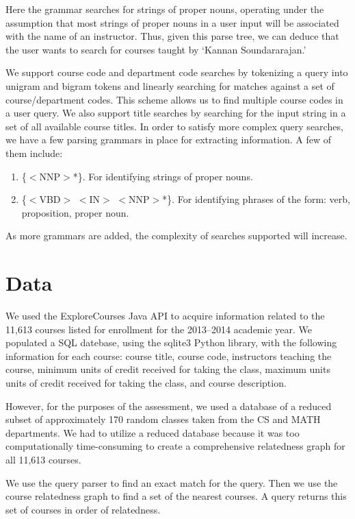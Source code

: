 \documentclass[12pt]{article}
\begin{document}
\noindent Here the grammar searches for strings of proper nouns, operating under the assumption that most strings of proper nouns in a user input will be associated with the name of an instructor. Thus, given this parse tree, we can deduce that the user wants to search for courses taught by `Kannan Soundararajan.'


We support course code and department code searches by tokenizing a
query into unigram and bigram tokens and linearly searching for
matches against a set of course/department codes. This scheme allows
us to find multiple course codes in a user query. We also support
title searches by searching for the input string in a set of all
available course titles. In order to satisfy more complex query
searches, we have a few parsing grammars in place for extracting
information. A few of them include:
\begin{enumerate}
	\item \{$<$NNP$>$*\}. For identifying strings of proper nouns.

	\item \{$<$VBD$>$ $<$IN$>$ $<$NNP$>$*\}. For identifying phrases of the form: verb, proposition, proper noun.
\end{enumerate}

As more grammars are added, the complexity of searches supported will increase.


\section*{Data}
We used the ExploreCourses Java API to acquire information related to
the 11,613 courses listed for enrollment for the 2013–2014 academic
year. We populated a SQL datebase, using the sqlite3 Python library,
with the following information for each course: course title, course
code, instructors teaching the course, minimum units of credit
received for taking the class, maximum units units of credit received
for taking the class, and course description.

However, for the purposes of the assessment, we used a database of a
reduced subset of approximately 170 random classes taken from the CS
and MATH departments. We had to utilize a reduced database because it
was too computationally time-consuming to create a comprehensive relatedness graph for
all 11,613 courses.

We use the query parser to find an exact match for the query. Then we
use the course relatedness graph to find a set of the nearest
courses. A query returns this set of courses in order of relatedness.
\end{document}
